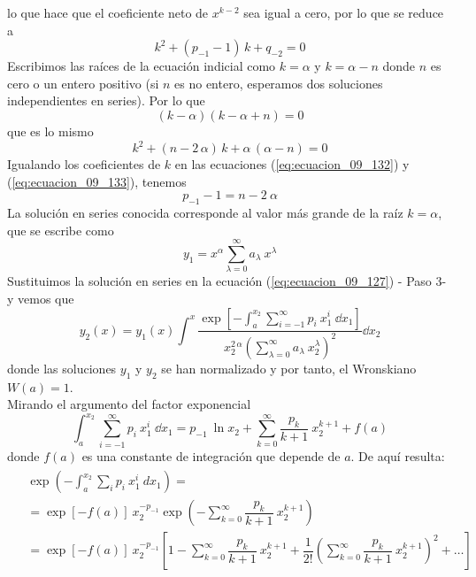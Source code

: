 lo que hace que el coeficiente neto de $x^{k-2}$ sea igual a cero, por lo que se reduce a
\begin{equation}
k^{2} + (p_{-1} - 1) \, k + q_{-2} = 0
\label{eq:ecuacion_09_132}
\end{equation}
Escribimos las raíces de la ecuación indicial como $k = \alpha$ y $k= \alpha -n$ donde $n$ es cero o un entero positivo (si $n$ es no entero, esperamos dos soluciones independientes en series). Por lo que
\begin{equation}
(k - \alpha)(k - \alpha + n) = 0
\label{eq:ecuacion_09_133}
\end{equation}
que es lo mismo
\[ k^{2} + (n - 2 \, \alpha) \, k + \alpha \, (\alpha - n) = 0\]
Igualando los coeficientes de $k$ en las ecuaciones (\ref{eq:ecuacion_09_132}) y (\ref{eq:ecuacion_09_133}), tenemos
\begin{equation}
p_{-1} -1 = n - 2 \: \alpha
\label{eq:ecuacion_09_134}
\end{equation}
La solución en series conocida corresponde al valor más grande de la raíz $k=\alpha$, que se escribe como
\[ y_{1} =  x^{\alpha} \sum_{\lambda=0}^{\infty} a_{\lambda} \: x^{\lambda} \]
Sustituimos la solución en series en la ecuación (\ref{eq:ecuacion_09_127}) - Paso 3- y vemos que
\begin{equation}
y_{2}(x) = y_{1} (x) \int^{x} \dfrac{\exp \left[ \displaystyle - \int_{a}^{x_{2}} \sum_{i=-1}^{\infty} p_{i} \: x^{i}_{1} \: \dd{x_{1}} \right] }{x_{2}^{2 \, \alpha} \left( \displaystyle \sum_{\lambda=0}^\infty a_{\lambda} \: x_{2}^{\lambda} \right)^{2} } \dd{x_{2}}
\label{eq:ecuacion_09_135}
\end{equation}
donde las soluciones $y_{1}$ y $y_{2}$ se han normalizado y por tanto, el Wronskiano $W(a)=1$. 
\\
Mirando el argumento del factor exponencial
\begin{equation}
\int_{a}^{x_{2}} \sum_{i=-1}^{\infty} p_{i} \: x_{1}^{i} \: \dd{x_{1}} = p_{-1} \: \ln x_{2} + \sum_{k=0}^{\infty} \dfrac{p_{k}}{k+1} \: x_{2}^{k+1} + f(a)
\label{eq:ecuacion_09_136}
\end{equation}
donde $f(a)$ es una constante de integración que depende de $a$. De aquí resulta:
\begin{align}
\begin{aligned}
&{}\exp \left( - \int_{a}^{x_{2}} \sum_{i} p_{i} \: x_{1}^{i} \: dx_{1} \right) =  \\
&= \exp [ - f(a) ] \: x_{2}^{-p_{-1}} \exp \left( - \sum_{k=0}^{\infty} \dfrac{p_{k}}{k+1} \: x_{2}^{k+1} \right)  \\
&= \exp [ - f(a) ] \: x_{2}^{-p_{-1}} \left[ 1 - \sum_{k=0}^{\infty} \dfrac{p_{k}}{k+1} \: x_{2}^{k+1} + \dfrac{1}{2!} \left( \sum_{k=0}^{\infty} \dfrac{p_{k}}{k+1} \: x_{2}^{k+1} \right)^{2} + \ldots \right]
\end{aligned}
\label{eq:ecuacion_09_137}
\end{align}
